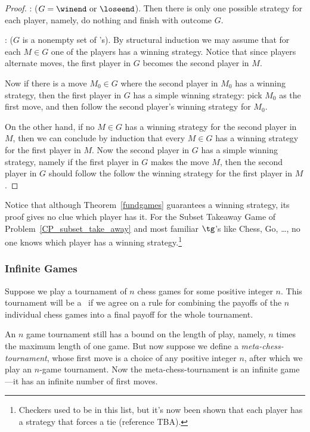 \begin{definition}
\begin{proof}
: ($G = \winend\text{ or }\loseend$).  Then
there is only one possible strategy for each player, namely, do
nothing and finish with outcome $G$.

: ($G$ is a nonempty set of \wnls's).
By structural induction we may assume that for each $M \in G$ one of
the players has a winning strategy.  Notice that since players
alternate moves, the first player in $G$ becomes the second player in
$M$.

Now if there is a move $M_0 \in G$ where the second player in $M_0$ has a
winning strategy, then the first player in $G$ has a simple winning
strategy: pick $M_0$ as the first move, and then follow the second
player's winning strategy for $M_0$.

On the other hand, if no $M \in G$ has a winning strategy for the
second player in $M$, then we can conclude by induction that every $M
\in G$ has a winning strategy for the first player in $M$.  Now the
second player in $G$ has a simple winning strategy, namely if the first
player in $G$ makes the move $M$, then the second player in $G$ should
follow the follow the winning strategy for the first player in $M$.
\end{proof}

Notice that although Theorem~\ref{fundgames} guarantees a winning
strategy, its proof gives no clue which player has it.  For the Subset
Takeaway Game of Problem~\ref{CP_subset_take_away} and most familiar
$\tg$'s like Chess, Go, \dots, no one knows which player has a winning
strategy.\footnote{Checkers used to be in this list, but it's now been
  shown that each player has a strategy that forces a tie (reference
  TBA).}

\begin{optional}

\subsubsection{Infinite Games} 

Suppose we play a tournament of $n$ chess games for some
positive integer $n$.  This tournament will be a \wnls\ if we agree on a
rule for combining the payoffs of the $n$ individual chess games into
a final payoff for the whole tournament.

An $n$ game tournament still has a bound on the length of play,
namely, $n$ times the maximum length of one game.  But now suppose we
define a \emph{meta-chess-tournament}, whose first move is a choice of
any positive integer $n$, after which we play an $n$-game tournament.
Now the meta-chess-tournament is an infinite game---it has an infinite
number of first moves.


\end{optional}
\end{definition}
